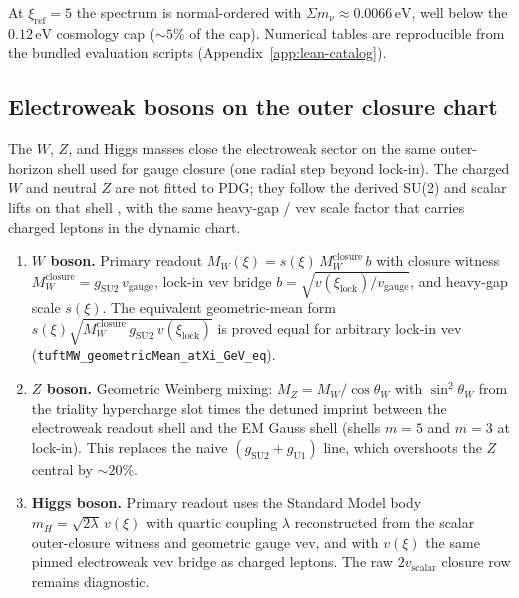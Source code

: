 \documentclass[11pt]{amsart}
\begin{document}
At $\xi_{\mathrm{ref}}=5$ the spectrum is normal-ordered with
$\Sigma m_\nu \approx 0.0066\,\mathrm{eV}$, well below the $0.12\,\mathrm{eV}$ cosmology cap
($\sim 5\%$ of the cap). Numerical tables are reproducible from the bundled evaluation scripts (Appendix~\ref{app:lean-catalog}).

\subsection{Electroweak bosons on the outer closure chart}

The $W$, $Z$, and Higgs masses close the electroweak sector on the same outer-horizon shell used for gauge closure (one radial step beyond lock-in). The charged $W$ and neutral $Z$ are not fitted to PDG; they follow the derived SU(2) and scalar lifts on that shell \cite{glashow1961,weinberg1967,salam1968}, with the same heavy-gap / vev scale factor that carries charged leptons in the dynamic chart.

\begin{enumerate}[label=(\roman*),nosep]
\item \textbf{$W$ boson.} Primary readout
  $M_W(\xi)=s(\xi)\,M_W^{\mathrm{closure}}\,b$ with closure witness
  $M_W^{\mathrm{closure}}=g_{\mathrm{SU2}}\,v_{\mathrm{gauge}}$, lock-in vev bridge
  $b=\sqrt{v(\xi_{\mathrm{lock}})/v_{\mathrm{gauge}}}$, and heavy-gap scale $s(\xi)$.
  The equivalent geometric-mean form
  $s(\xi)\sqrt{M_W^{\mathrm{closure}}\,g_{\mathrm{SU2}}\,v(\xi_{\mathrm{lock}})}$
  is proved equal for arbitrary lock-in vev (\texttt{tuftMW\_geometricMean\_atXi\_GeV\_eq}).
\item \textbf{$Z$ boson.} Geometric Weinberg mixing: $M_Z = M_W / \cos\theta_W$ with
  $\sin^2\theta_W$ from the triality hypercharge slot times the detuned imprint between the electroweak readout shell and the EM Gauss shell (shells $m=5$ and $m=3$ at lock-in). This replaces the naive $(g_{\mathrm{SU2}}+g_{\mathrm{U1}})$ line, which overshoots the $Z$ central by $\sim 20\%$.
\item \textbf{Higgs boson.} Primary readout uses the Standard Model body
  $m_H = \sqrt{2\lambda}\,v(\xi)$ \cite{higgs1964,englert1964,peskin1995} with quartic coupling $\lambda$ reconstructed from the
  scalar outer-closure witness and geometric gauge vev, and with $v(\xi)$ the same
  pinned electroweak vev bridge as charged leptons. The raw $2 v_{\mathrm{scalar}}$ closure
  row remains diagnostic.
\end{enumerate}
\end{document}
